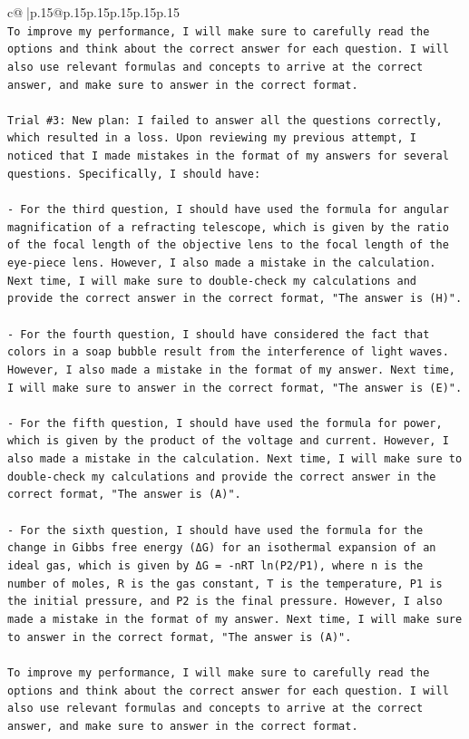 \documentclass{article}
\begin{document}
{\begin{supertabular}{c@{$\;$}|p{.15\linewidth}@{}p{.15\linewidth}p{.15\linewidth}p{.15\linewidth}p{.15\linewidth}p{.15\linewidth}}
{{{\\ 
\texttt{To improve my performance, I will make sure to carefully read the options and think about the correct answer for each question. I will also use relevant formulas and concepts to arrive at the correct answer, and make sure to answer in the correct format.} \\
\\ 
\texttt{Trial \#3: New plan: I failed to answer all the questions correctly, which resulted in a loss. Upon reviewing my previous attempt, I noticed that I made mistakes in the format of my answers for several questions. Specifically, I should have:} \\
\\ 
\texttt{{-} For the third question, I should have used the formula for angular magnification of a refracting telescope, which is given by the ratio of the focal length of the objective lens to the focal length of the eye{-}piece lens. However, I also made a mistake in the calculation. Next time, I will make sure to double{-}check my calculations and provide the correct answer in the correct format, "The answer is (H)".} \\
\\ 
\texttt{{-} For the fourth question, I should have considered the fact that colors in a soap bubble result from the interference of light waves. However, I also made a mistake in the format of my answer. Next time, I will make sure to answer in the correct format, "The answer is (E)".} \\
\\ 
\texttt{{-} For the fifth question, I should have used the formula for power, which is given by the product of the voltage and current. However, I also made a mistake in the calculation. Next time, I will make sure to double{-}check my calculations and provide the correct answer in the correct format, "The answer is (A)".} \\
\\ 
\texttt{{-} For the sixth question, I should have used the formula for the change in Gibbs free energy (ΔG) for an isothermal expansion of an ideal gas, which is given by ΔG = {-}nRT ln(P2/P1), where n is the number of moles, R is the gas constant, T is the temperature, P1 is the initial pressure, and P2 is the final pressure. However, I also made a mistake in the format of my answer. Next time, I will make sure to answer in the correct format, "The answer is (A)".} \\
\\ 
\texttt{To improve my performance, I will make sure to carefully read the options and think about the correct answer for each question. I will also use relevant formulas and concepts to arrive at the correct answer, and make sure to answer in the correct format.} \\
}}}
\end{supertabular}}
\end{document}
